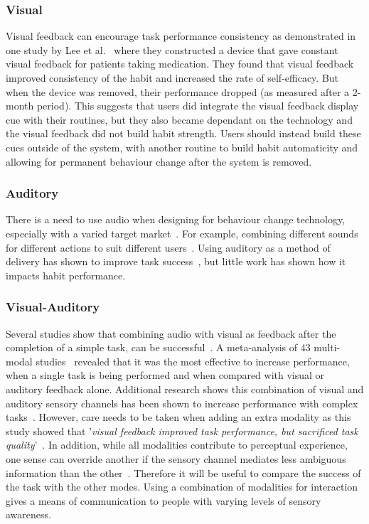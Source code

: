 \subsubsection{Visual}
Visual feedback can encourage task performance consistency as demonstrated in one study by Lee et al.~\cite{article_realtime_feedback_improving_medication_taking} where they constructed a device that gave constant visual feedback for patients taking medication. They found that visual feedback improved consistency of the habit and increased the rate of self-efficacy. But when the device was removed, their performance dropped (as measured after a 2-month period). This suggests that users did integrate the visual feedback display cue with their routines, but they also became dependant on the technology and the visual feedback did not build habit strength. Users should instead build these cues outside of the system, with another routine to build habit automaticity and allowing for permanent behaviour change after the system is removed.

\subsubsection{Auditory}
There is a need to use audio when designing for behaviour change technology, especially with a varied target market~\cite{article_designing_for_health_behaviour_change_hci}. For example, combining different sounds for different actions to suit different users~\cite{article_movipill_improving_medication_elders}. Using auditory as a method of delivery has shown to improve task success~\cite{auditory_notifications_increase_delivery_success}, but little work has shown how it impacts habit performance.


\subsubsection{Visual-Auditory}
Several studies show that combining audio with visual as feedback after the completion of a simple task, can be successful~\cite{benefits_of_audio_visual_1, benefits_of_audio_visual_2}. A meta-analysis of 43 multi-modal studies~\cite{comparing_modalities_effects_of_visual_auditory} revealed that it was the most effective to increase performance, when a single task is being performed and when compared with visual or auditory feedback alone. Additional research shows this combination of visual and auditory sensory channels has been shown to increase performance with complex tasks~\cite{chi_oussama_tap_the_shapetones}. However, care needs to be taken when adding an extra modality as this study showed that '\textit{visual feedback improved task performance, but sacrificed task quality}'~\cite{comparing_modalities_effects_of_visual_auditory}. In addition, while all modalities contribute to perceptual experience, one sense can override another if the sensory channel mediates less ambiguous information than the other~\cite{one_mode_override_another}. Therefore it will be useful to compare the success of the task with the other modes. Using a combination of modalities for interaction gives a means of communication to people with varying levels of sensory awareness.

